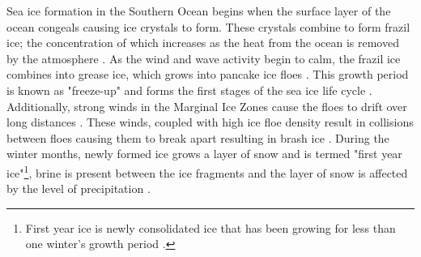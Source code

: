 Sea ice formation in the Southern Ocean begins when the surface layer of the ocean congeals causing ice crystals to form. These crystals combine to form frazil ice; the concentration of which increases as the heat from the ocean is removed by the atmosphere \cite{arrigo2004large}. As the wind and wave activity begin to calm, the frazil ice combines into grease ice, which grows into pancake ice floes \cite{arrigo2004large}. This growth period is known as "freeze-up" and forms the first stages of the sea ice life cycle \cite{barber2005microwave}. Additionally, strong winds in the Marginal Ice Zones cause the floes to drift over long distances \cite{alberello2019drift}. These winds, coupled with high ice floe density result in collisions between floes causing them to break apart \cite{STEER2008933} resulting in brash ice \cite{icedefinition1992}.  During the winter months, newly formed ice grows a layer of snow \cite{barber2005microwave} and is termed "first year ice"\footnote{First year ice is newly consolidated ice that has been growing for less than one winter's growth period \cite{icedefinition1992}.}, brine is present between the ice fragments and the layer of snow is affected by the level of precipitation \cite{barber2005microwave}.\par


